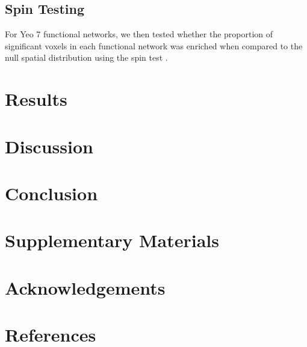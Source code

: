 \documentclass[
  12pt,
]{article}
\begin{document}
\hypertarget{spin-testing}{%
\subsection{Spin Testing}\label{spin-testing}}

For Yeo 7 functional networks, we then tested whether the proportion of significant voxels in each functional network was enriched when compared to the null spatial distribution using the spin test \citep{alexander-bloch_testing_2018}.

\hypertarget{results}{%
\section{Results}\label{results}}

\hypertarget{discussion}{%
\section{Discussion}\label{discussion}}

\hypertarget{conclusion}{%
\section{Conclusion}\label{conclusion}}

\hypertarget{supplementary-materials}{%
\section{Supplementary Materials}\label{supplementary-materials}}

\hypertarget{acknowledgements}{%
\section{Acknowledgements}\label{acknowledgements}}

\hypertarget{references}{%
\section{References}\label{references}}

  
\end{document}
